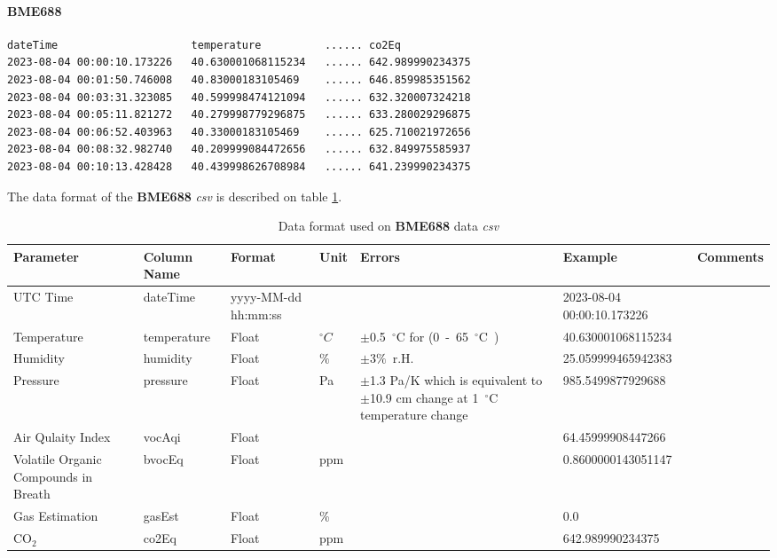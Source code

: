 \documentclass[12pt]{article}
\begin{document}
\paragraph{BME688}
    \label{sec:bme688DataFormat}
        {\begin{verbatim}
dateTime                     temperature          ...... co2Eq
2023-08-04 00:00:10.173226   40.630001068115234   ...... 642.989990234375
2023-08-04 00:01:50.746008   40.83000183105469    ...... 646.859985351562
2023-08-04 00:03:31.323085   40.599998474121094   ...... 632.320007324218
2023-08-04 00:05:11.821272   40.279998779296875   ...... 633.280029296875
2023-08-04 00:06:52.403963   40.33000183105469    ...... 625.710021972656
2023-08-04 00:08:32.982740   40.209999084472656   ...... 632.849975585937
2023-08-04 00:10:13.428428   40.439998626708984   ...... 641.239990234375
\end{verbatim} }
The data format of the \textbf{BME688} \emph{csv} is described on table \ref{t:dataFormatbme688}.
        \begin{table}[H]
    	\caption{Data format used on \textbf{BME688} data \emph{csv}}
    	 \label{t:dataFormatbme688}
    	\small
    	\begin{tabular}{||p{2cm}| p{2cm}|p{2cm}|p{1.5cm}|p{1.5cm}|p{2cm}|p{2cm}||}
    		\hline
    		\hline
    		Parameter & Column Name & Format & Unit & Errors & Example & Comments \\ 
            \hline
            \hline
    	    UTC Time & dateTime & yyyy-MM-dd hh:mm:ss & & & \tiny 2023-08-04 00:00:10.173226 &  \\
    	    \hline
    		Temperature & temperature  & Float & 
               $ ^{\circ} C$  & \hbox{$\pm$0.5 $^{\circ}$C} for \hbox{(0 - 65 $^{\circ}$C )}& \tiny 40.630001068115234 &  \\
               	\hline
    		Humidity & humidity  & Float & 
               $ \% $  & \hbox{$\pm$3$\%$ r.H.} & \tiny 25.059999465942383 & \\
                \hline
                Pressure & pressure  & Float & 
               Pa  &    \tiny $\pm$1.3 Pa/K which is equivalent to $\pm$10.9 cm change at \hbox{1 $^{\circ}$C} \hbox{temperature} change & \tiny  985.5499877929688  &  \\
               	\hline
    		Air Qulaity Index & vocAqi    & Float & 
                 & &  \tiny 64.45999908447266   & \\
                \hline
    		Volatile Organic Compounds in Breath & bvocEq   & Float & 
               ppm  & & \tiny 0.8600000143051147 & \\
                \hline 
    		\hbox{Gas} \hbox{Estimation} & gasEst   & Float & 
               \%  & & \tiny 0.0  & \\
                \hline
    		CO$_{2}$ & co2Eq  & Float & 
               ppm  & & \tiny 642.989990234375 & \\
               	\hline
    		\hline
    	\end{tabular}
    \end{table}
\clearpage
\end{document}
